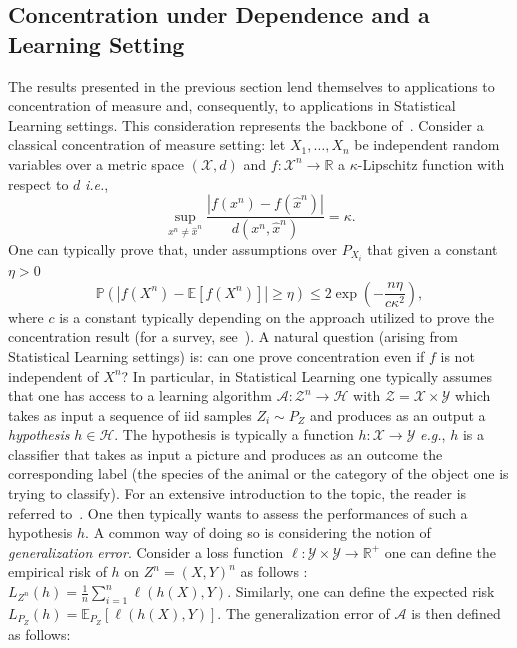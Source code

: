 \documentclass{article}
\numberwithin{theorem}{section}
\numberwithin{example}{section}
\numberwithin{remark}{section}
\numberwithin{definition}{section}
\begin{document}
\subsection{Concentration under Dependence and a Learning Setting}\label{sec:concentrationLearning}
The results presented in the previous section lend themselves to applications to concentration of measure and, consequently, to applications in Statistical Learning settings. This consideration represents the backbone of~\cite{EspositoGI:2021}. Consider a classical concentration of measure setting: let $X_1,\ldots,X_n$ be independent random variables over a metric space $(\mathcal{X},d)$ and $f:\mathcal{X}^n\to \mathbb{R}$ a $\kappa$-Lipschitz function with respect to $d$ \textit{i.e.}, 
\begin{equation}
    \sup_{x^n\neq \hat{x}^n} \frac{|f(x^n)-f(\hat{x}^n)|}{d(x^n,\hat{x}^n)} =  \kappa.
\end{equation}
One can typically prove that, under assumptions over $P_{X_i}$ that given a constant $\eta>0$
\begin{equation}
  \mathbb{P}(|f(X^n)-\mathbb{E}[f(X^n)]|\geq \eta) \leq 2\exp\left(-\frac{n\eta}{c \kappa^2} \right), \label{eq:concentrationIndependence}
\end{equation}
where $c$ is a constant typically depending on the approach utilized to prove the concentration result (for a survey, see~\cite{RaginskyS:14}). A natural question (arising from Statistical Learning settings) is: 
can one prove concentration even if $f$ is not independent of $X^n$? In particular, in Statistical Learning one typically assumes that one has access to a learning algorithm $\mathcal{A}:\mathcal{Z}^n\to \mathcal{H}$ with $\mathcal{Z}=\mathcal{X}\times\mathcal{Y}$ which takes as input a sequence of iid samples $Z_i\sim P_{Z}$ and produces as an output a \emph{hypothesis} $h\in\mathcal{H}$. The hypothesis is typically a function $h:\mathcal{X}\to\mathcal{Y}$ \textit{e.g.}, $h$ is a classifier that takes as input a picture and produces as an outcome the corresponding label (the species of the animal or the category of the object one is trying to classify). For an extensive introduction to the topic, the reader is referred to~\cite{shalevShwartzBD:14}.  One then typically wants to assess the performances of such a hypothesis $h$. A common way of doing so is considering the notion of \emph{generalization error}. Consider a loss function $\ell:\mathcal{Y}\times\mathcal{Y}\to\mathbb{R}^+$ one can define the empirical risk of $h$ on $Z^n=(X,Y)^n$ as follows : $L_{Z^n}(h) = \frac1n \sum_{i=1}^n \ell(h(X),Y)$. Similarly, one can define the expected risk $L_{P_Z}(h) = \mathbb{E}_{P_Z}[\ell(h(X),Y)]$. The generalization error of $\mathcal{A}$ is then defined as follows:
\end{document}
